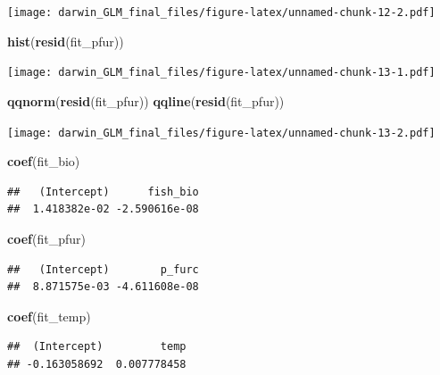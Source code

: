 \documentclass[]{article}
\newenvironment{Shaded}{\begin{snugshade}}{\end{snugshade}}
\newcommand{\KeywordTok}[1]{\textcolor[rgb]{0.13,0.29,0.53}{\textbf{#1}}}
\newcommand{\NormalTok}[1]{#1}
\begin{document}
\texttt{[image: darwin\_GLM\_final\_files/figure-latex/unnamed-chunk-12-2.pdf]}

\begin{Shaded}
\begin{Highlighting}[]
\KeywordTok{hist}\NormalTok{(}\KeywordTok{resid}\NormalTok{(fit_pfur))}
\end{Highlighting}
\end{Shaded}

\texttt{[image: darwin\_GLM\_final\_files/figure-latex/unnamed-chunk-13-1.pdf]}

\begin{Shaded}
\begin{Highlighting}[]
\KeywordTok{qqnorm}\NormalTok{(}\KeywordTok{resid}\NormalTok{(fit_pfur))}
\KeywordTok{qqline}\NormalTok{(}\KeywordTok{resid}\NormalTok{(fit_pfur))}
\end{Highlighting}
\end{Shaded}

\texttt{[image: darwin\_GLM\_final\_files/figure-latex/unnamed-chunk-13-2.pdf]}

\begin{Shaded}
\begin{Highlighting}[]
\KeywordTok{coef}\NormalTok{(fit_bio)}
\end{Highlighting}
\end{Shaded}

\begin{verbatim}
##   (Intercept)      fish_bio 
##  1.418382e-02 -2.590616e-08
\end{verbatim}

\begin{Shaded}
\begin{Highlighting}[]
\KeywordTok{coef}\NormalTok{(fit_pfur) }
\end{Highlighting}
\end{Shaded}

\begin{verbatim}
##   (Intercept)        p_furc 
##  8.871575e-03 -4.611608e-08
\end{verbatim}

\begin{Shaded}
\begin{Highlighting}[]
\KeywordTok{coef}\NormalTok{(fit_temp) }
\end{Highlighting}
\end{Shaded}

\begin{verbatim}
##  (Intercept)         temp 
## -0.163058692  0.007778458
\end{verbatim}
\end{document}
